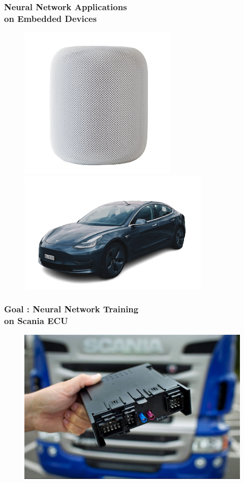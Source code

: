 \documentclass{beamer}
\begin{document}
\begin{frame}
  \frametitle{Neural Network Applications \\ on Embedded Devices}

  \begin{figure}
    \centering
    \includegraphics[scale=0.42]{images/smart-speaker}
    \includegraphics[scale=0.42]{images/tesla}
  \end{figure}

\end{frame}

\begin{frame}
  \frametitle{Goal : Neural Network Training \\ on Scania ECU}

  \begin{figure}
    \centering
    \includegraphics[scale=0.21]{../Body/images/c300.jpeg}
  \end{figure}

\end{frame}
\end{document}
